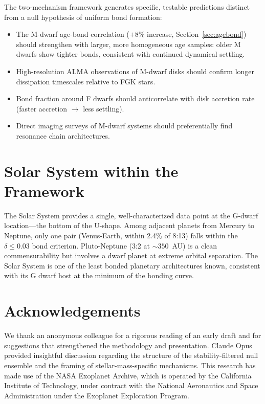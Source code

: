 \documentclass[twocolumn,usenatbib]{mnras}
\begin{document}
The two-mechanism framework generates specific, testable predictions distinct
from a null hypothesis of uniform bond formation:
\begin{itemize}
  \item The M-dwarf age-bond correlation ($+8\%$ increase,
        Section~\ref{sec:agebond}) should strengthen with larger, more
        homogeneous age samples: older M dwarfs show tighter bonds, consistent
        with continued dynamical settling.
  \item High-resolution ALMA observations of M-dwarf disks should confirm
        longer dissipation timescales relative to FGK stars.
  \item Bond fraction around F dwarfs should anticorrelate with disk accretion
        rate (faster accretion $\rightarrow$ less settling).
  \item Direct imaging surveys of M-dwarf systems should preferentially find
        resonance chain architectures.
\end{itemize}

\section{Solar System within the Framework}

The Solar System provides a single, well-characterized data point at the
G-dwarf location---the bottom of the U-shape. Among adjacent planets from
Mercury to Neptune, only one pair (Venus-Earth, within 2.4\% of 8:13) falls
within the $\delta \leq 0.03$ bond criterion. Pluto-Neptune (3:2 at $\sim
350$~AU) is a clean commensurability but involves a dwarf planet at extreme
orbital separation. The Solar System is one of the least bonded planetary
architectures known, consistent with its G dwarf host at the minimum of the
bonding curve.

\section{Acknowledgements}

We thank an anonymous colleague for a rigorous reading of an early draft and
for suggestions that strengthened the methodology and presentation. Claude
Opus provided insightful discussion regarding the structure of the
stability-filtered null ensemble and the framing of stellar-mass-specific
mechanisms. This research has made use of the NASA Exoplanet Archive, which is
operated by the California Institute of Technology, under contract with the
National Aeronautics and Space Administration under the Exoplanet Exploration
Program.
\end{document}
